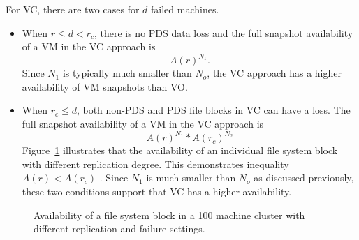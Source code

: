 For VC, there are two cases for $d$ failed machines.
\begin{itemize}
\item
When $r \le d<r_c$,  there is no PDS data loss and  
the full snapshot availability of a VM in the VC approach is 
\begin{equation}
\label{eq:VC1}
A(r)^{N_1}.
\end{equation}
Since $N_1$ is typically much smaller than $N_o$, 
the VC approach has a higher availability of VM snapshots than VO.

\item
When $r_c \leq d$, both non-PDS and PDS file blocks in VC can have a loss.
The full snapshot availability of  a VM in the VC approach is
\begin{equation}
\label{eq:VC2}
A(r)^{N_1} * A(r_c)^{N_2}
\end{equation}
Figure~\ref{fig:fsb-availability} illustrates that the availability of an individual file system block
with different replication degree. This demonstrates inequality 
$A(r) < A(r_c)$
.  Since $N_1$ is much smaller than $N_o$ as discussed previously, 
these two conditions support that VC has a  higher availability. 
\end{itemize} 

\begin{figure}[htbp]
  \centering
    \caption{Availability of a file system block in a 100 machine cluster with different replication 
and failure settings.}
  \label{fig:fsb-availability}
\end{figure}

